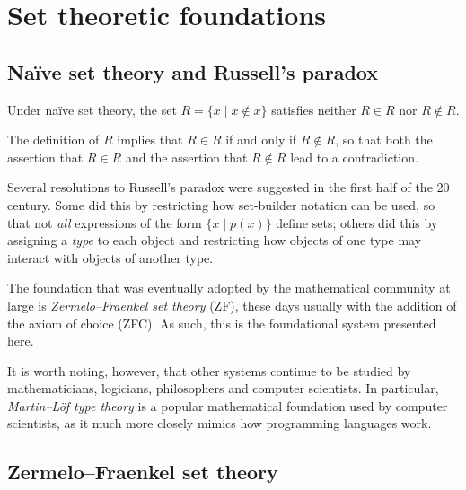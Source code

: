 \section{Set theoretic foundations}

\todo{}

\subsection*{Na\"{i}ve set theory and Russell's paradox}

\todo{}

\begin{theorem}
\label{thmRussellsParadox}
Under na\"{i}ve set theory, the set $R = \{ x \mid x \not\in x \}$ satisfies neither $R \in R$ nor $R \not\in R$.
\end{theorem}

\begin{cproof}
The definition of $R$ implies that $R \in R$ if and only if $R \not\in R$, so that both the assertion that $R \in R$ and the assertion that $R \not\in R$ lead to a contradiction.
\end{cproof}

Several resolutions to Russell's paradox were suggested in the first half of the 20\supth{} century. Some did this by restricting how set-builder notation can be used, so that not \textit{all} expressions of the form $\{ x \mid p(x) \}$ define sets; others did this by assigning a \textit{type} to each object and restricting how objects of one type may interact with objects of another type.

The foundation that was eventually adopted by the mathematical community at large is \textit{Zermelo--Fraenkel set theory} (ZF), these days usually with the addition of the axiom of choice (ZFC). As such, this is the foundational system presented here.

It is worth noting, however, that other systems continue to be studied by mathematicians, logicians, philosophers and computer scientists. In particular, \textit{Martin--L\"{o}f type theory} is a popular mathematical foundation used by computer scientists, as it much more closely mimics how programming languages work.

\subsection*{Zermelo--Fraenkel set theory}

